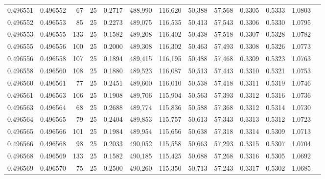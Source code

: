 \begin{tabular}{rrrrrrrrrrrrr}
0.496551 & 0.496552 &    67 &  25 &                                     0.2717 & 488,990 & 116,620 &  50,388 &  57,568 & 0.3305 & 0.5333 & 1.0803 \\
0.496552 & 0.496553 &    85 &  25 &                                     0.2273 & 489,075 & 116,535 &  50,413 &  57,543 & 0.3306 & 0.5330 & 1.0795 \\
0.496553 & 0.496555 &   133 &  25 &                                     0.1582 & 489,208 & 116,402 &  50,438 &  57,518 & 0.3307 & 0.5328 & 1.0782 \\
0.496555 & 0.496556 &   100 &  25 &                                     0.2000 & 489,308 & 116,302 &  50,463 &  57,493 & 0.3308 & 0.5326 & 1.0773 \\
0.496556 & 0.496558 &   107 &  25 &                                     0.1894 & 489,415 & 116,195 &  50,488 &  57,468 & 0.3309 & 0.5323 & 1.0763 \\
0.496558 & 0.496560 &   108 &  25 &                                     0.1880 & 489,523 & 116,087 &  50,513 &  57,443 & 0.3310 & 0.5321 & 1.0753 \\
0.496560 & 0.496561 &    77 &  25 &                                     0.2451 & 489,600 & 116,010 &  50,538 &  57,418 & 0.3311 & 0.5319 & 1.0746 \\
0.496561 & 0.496563 &   106 &  25 &                                     0.1908 & 489,706 & 115,904 &  50,563 &  57,393 & 0.3312 & 0.5316 & 1.0736 \\
0.496563 & 0.496564 &    68 &  25 &                                     0.2688 & 489,774 & 115,836 &  50,588 &  57,368 & 0.3312 & 0.5314 & 1.0730 \\
0.496564 & 0.496565 &    79 &  25 &                                     0.2404 & 489,853 & 115,757 &  50,613 &  57,343 & 0.3313 & 0.5312 & 1.0723 \\
0.496565 & 0.496566 &   101 &  25 &                                     0.1984 & 489,954 & 115,656 &  50,638 &  57,318 & 0.3314 & 0.5309 & 1.0713 \\
0.496566 & 0.496568 &    98 &  25 &                                     0.2033 & 490,052 & 115,558 &  50,663 &  57,293 & 0.3315 & 0.5307 & 1.0704 \\
0.496568 & 0.496569 &   133 &  25 &                                     0.1582 & 490,185 & 115,425 &  50,688 &  57,268 & 0.3316 & 0.5305 & 1.0692 \\
0.496569 & 0.496570 &    75 &  25 &                                     0.2500 & 490,260 & 115,350 &  50,713 &  57,243 & 0.3317 & 0.5302 & 1.0685 \\

\end{tabular}
